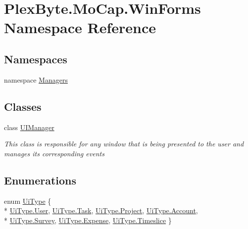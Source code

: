 \hypertarget{namespace_plex_byte_1_1_mo_cap_1_1_win_forms}{}\section{Plex\+Byte.\+Mo\+Cap.\+Win\+Forms Namespace Reference}
\label{namespace_plex_byte_1_1_mo_cap_1_1_win_forms}
\subsection*{Namespaces}
\begin{DoxyCompactItemize}
\item 
namespace \hyperlink{namespace_plex_byte_1_1_mo_cap_1_1_win_forms_1_1_managers}{Managers}
\end{DoxyCompactItemize}
\subsection*{Classes}
\begin{DoxyCompactItemize}
\item 
class \hyperlink{class_plex_byte_1_1_mo_cap_1_1_win_forms_1_1_u_i_manager}{U\+I\+Manager}
\begin{DoxyCompactList}\small\item\em This class is responsible for any window that is being presented to the user and manages its corresponding events \end{DoxyCompactList}\end{DoxyCompactItemize}
\subsection*{Enumerations}
\begin{DoxyCompactItemize}
\item 
enum \hyperlink{namespace_plex_byte_1_1_mo_cap_1_1_win_forms_a542bb6f06ab0cb20fe2382da955de892}{Ui\+Type} \{ \\*
\hyperlink{namespace_plex_byte_1_1_mo_cap_1_1_win_forms_a542bb6f06ab0cb20fe2382da955de892a8f9bfe9d1345237cb3b2b205864da075}{Ui\+Type.\+User}, 
\hyperlink{namespace_plex_byte_1_1_mo_cap_1_1_win_forms_a542bb6f06ab0cb20fe2382da955de892aeaeb30f9f18e0c50b178676f3eaef45f}{Ui\+Type.\+Task}, 
\hyperlink{namespace_plex_byte_1_1_mo_cap_1_1_win_forms_a542bb6f06ab0cb20fe2382da955de892a9e727fdd3aec8274f46685441900280d}{Ui\+Type.\+Project}, 
\hyperlink{namespace_plex_byte_1_1_mo_cap_1_1_win_forms_a542bb6f06ab0cb20fe2382da955de892a08bd40c7543007ad06e4fce31618f6ec}{Ui\+Type.\+Account}, 
\\*
\hyperlink{namespace_plex_byte_1_1_mo_cap_1_1_win_forms_a542bb6f06ab0cb20fe2382da955de892a9fd9f9ccd630cd4b6894051c35710572}{Ui\+Type.\+Survey}, 
\hyperlink{namespace_plex_byte_1_1_mo_cap_1_1_win_forms_a542bb6f06ab0cb20fe2382da955de892a7bf48cb939975c27a0d9cfa99c6f3461}{Ui\+Type.\+Expense}, 
\hyperlink{namespace_plex_byte_1_1_mo_cap_1_1_win_forms_a542bb6f06ab0cb20fe2382da955de892a72906614067bd9545cfa9b677c55d144}{Ui\+Type.\+Timeslice}
 \}
\end{DoxyCompactItemize}


